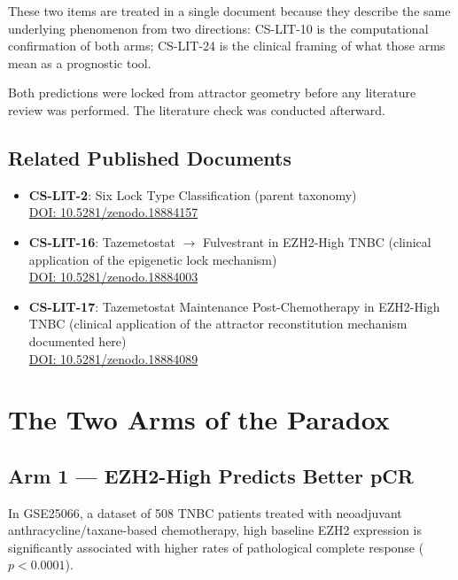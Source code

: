 \documentclass[12pt, a4paper]{article}
\begin{document}
These two items are treated in a single document because
they describe the same underlying phenomenon from two
directions: CS-LIT-10 is the computational confirmation
of both arms; CS-LIT-24 is the clinical framing of what
those arms mean as a prognostic tool.

Both predictions were locked from attractor geometry
before any literature review was performed. The
literature check was conducted afterward.

\subsection{Related Published Documents}

\begin{itemize}
    \item \textbf{CS-LIT-2}: Six Lock Type
    Classification (parent taxonomy)\\
    \href{https://doi.org/10.5281/zenodo.18884157}
    {DOI: 10.5281/zenodo.18884157}

    \item \textbf{CS-LIT-16}: Tazemetostat
    $\rightarrow$ Fulvestrant in EZH2-High TNBC
    (clinical application of the epigenetic lock
    mechanism)\\
    \href{https://doi.org/10.5281/zenodo.18884003}
    {DOI: 10.5281/zenodo.18884003}

    \item \textbf{CS-LIT-17}: Tazemetostat Maintenance
    Post-Chemotherapy in EZH2-High TNBC (clinical
    application of the attractor reconstitution
    mechanism documented here)\\
    \href{https://doi.org/10.5281/zenodo.18884089}
    {DOI: 10.5281/zenodo.18884089}
\end{itemize}

\section{The Two Arms of the Paradox}

\subsection{Arm 1 — EZH2-High Predicts Better pCR}

In GSE25066, a dataset of 508 TNBC patients treated
with neoadjuvant anthracycline/taxane-based
chemotherapy, high baseline EZH2 expression is
significantly associated with higher rates of
pathological complete response ($p < 0.0001$).
\end{document}

